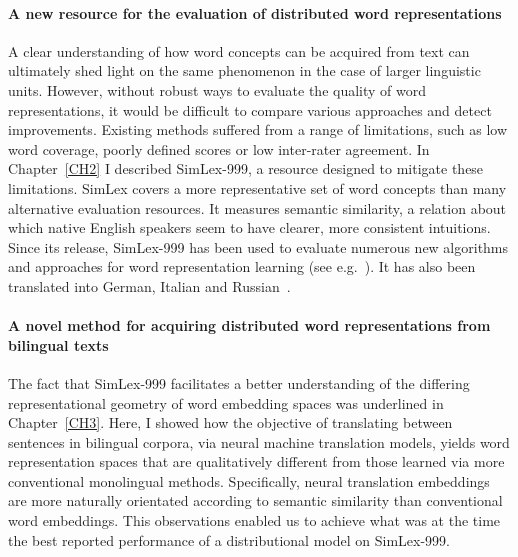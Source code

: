 \paragraph{A new resource for the evaluation of distributed word representations} A clear understanding of how word concepts can be acquired from text can ultimately shed light on the same phenomenon in the case of larger linguistic units. However, without robust ways to evaluate the quality of word representations, it would be difficult to compare various approaches and detect improvements. Existing methods suffered from a range of limitations, such as low word coverage, poorly defined scores or low inter-rater agreement. In Chapter~\ref{CH2} I described SimLex-999, a resource designed to mitigate these limitations. SimLex covers a more representative set of word concepts than many alternative evaluation resources. It measures semantic similarity, a relation about which native English speakers seem to have clearer, more consistent intuitions. Since its release, SimLex-999 has been used to evaluate numerous new algorithms and approaches for word representation learning (see e.g.~\citealt{lazaridou2015combining,levy2015improving,lu2015deep}). It has also been translated into German, Italian and Russian~\citep{leviant2016separated}. 

\paragraph{A novel method for acquiring distributed word representations from bilingual texts} The fact that SimLex-999 facilitates a better understanding of the differing representational geometry of word embedding spaces was underlined in Chapter~\ref{CH3}. Here, I showed how the objective of translating between sentences in bilingual corpora, via neural machine translation models, yields word representation spaces that are qualitatively different from those learned via more conventional monolingual methods. Specifically, neural translation embeddings are more naturally orientated according to semantic similarity than conventional word embeddings. This observations enabled us to achieve what was at the time the best reported performance of a distributional model on SimLex-999.  

